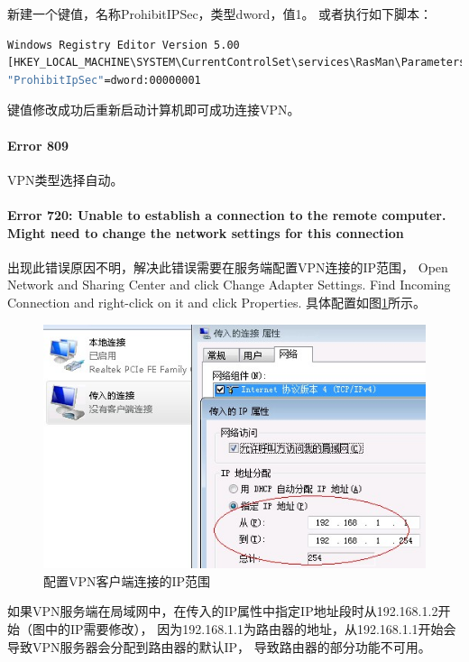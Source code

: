 \documentclass{book}
\begin{document}
新建一个键值，名称ProhibitIPSec，类型dword，值1。
或者执行如下脚本：

\begin{lstlisting}[language=Bash]
Windows Registry Editor Version 5.00
[HKEY_LOCAL_MACHINE\SYSTEM\CurrentControlSet\services\RasMan\Parameters]
"ProhibitIpSec"=dword:00000001
\end{lstlisting} 

键值修改成功后重新启动计算机即可成功连接VPN。

\paragraph{Error 809}VPN类型选择自动。

\paragraph{Error 720: Unable to establish a connection to the remote computer. Might need to change the network settings for this connection}

出现此错误原因不明，解决此错误需要在服务端配置VPN连接的IP范围，
Open Network and Sharing Center and click Change Adapter Settings.
Find Incoming Connection and right-click on it and click Properties.
具体配置如图\ref{fig:ConfigurationVPNIPAddressRange}所示。

\begin{figure}[htbp]
	\centering
	\includegraphics[scale=0.8]{ConfigurationVPNIPAddressRange.jpg}
	\caption{配置VPN客户端连接的IP范围}
	\label{fig:ConfigurationVPNIPAddressRange}
\end{figure}

如果VPN服务端在局域网中，在传入的IP属性中指定IP地址段时从192.168.1.2开始（图中的IP需要修改），
因为192.168.1.1为路由器的地址，从192.168.1.1开始会导致VPN服务器会分配到路由器的默认IP，
导致路由器的部分功能不可用。
\end{document}
